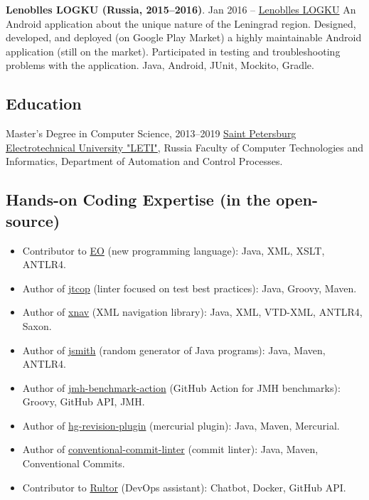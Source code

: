 \documentclass{vl}
\begin{document}
    \textbf{Lenoblles LOGKU (Russia, 2015--2016)}.
    Jan 2016 – \href{https://play.google.com/store/apps/details?id=com.altinntech.oopt_lo}{Lenoblles LOGKU}
    An Android application about the unique nature of the Leningrad region.
    Designed, developed, and deployed (on Google Play Market) a highly maintainable Android application
    (still on the market).
    Participated in testing and troubleshooting problems with the application.
    Java, Android, JUnit, Mockito, Gradle.

    \subsection*{Education}
    \begin{samepage}
        Master's Degree in Computer Science, 2013--2019\newline
        \href{https://etu.ru/en/university/}{Saint Petersburg Electrotechnical University "LETI"}, Russia\newline
        Faculty of Computer Technologies and Informatics, Department of Automation and Control Processes.
    \end{samepage}

    \subsection*{Hands-on Coding Expertise (in the open-source)}
    \begin{itemize}
        \itemsep0em
        \item Contributor to \href{https://www.eolang.org}{EO} (new programming language):
        Java, XML, XSLT, ANTLR4.
        \item Author of  \href{https://github.com/volodya-lombrozo/jtcop}{jtcop} (linter focused on test best practices):
        Java, Groovy, Maven.
        \item Author of \href{https://github.com/volodya-lombrozo/xnav}{xnav} (XML navigation library): Java, XML,
        VTD-XML, ANTLR4, Saxon.
        \item Author of \href{https://github.com/volodya-lombrozo/jsmith}{jsmith} (random generator of Java programs):
        Java, Maven, ANTLR4.
        \item Author of \href{https://github.com/volodya-lombrozo/jmh-benchmark-action}{jmh-benchmark-action}
        (GitHub Action for JMH benchmarks): Groovy, GitHub API, JMH.
        \item Author of \href{https://github.com/volodya-lombrozo/hg-revision-plugin}{hg-revision-plugin}
        (mercurial plugin): Java, Maven, Mercurial.
        \item Author of
        \href{https://github.com/volodya-lombrozo/conventional-commit-linter}{conventional-commit-linter}
        (commit linter): Java, Maven, Conventional Commits.
        \item Contributor to \href{https://www.rultor.com}{Rultor} (DevOps assistant): Chatbot, Docker, GitHub API.
    \end{itemize}
\end{document}
